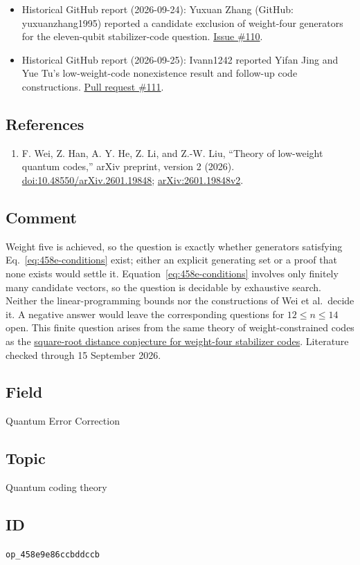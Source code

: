 \begin{itemize}
  \item Historical GitHub report (2026-09-24): Yuxuan Zhang (GitHub: yuxuanzhang1995) reported a candidate exclusion of weight-four generators for the eleven-qubit stabilizer-code question. \href{https://github.com/Naixu-Guo/quantum-open-problems/issues/110}{Issue \#110}.

  \item Historical GitHub report (2026-09-25): Ivann1242 reported Yifan Jing and Yue Tu's low-weight-code nonexistence result and follow-up code constructions. \href{https://github.com/Naixu-Guo/quantum-open-problems/pull/111}{Pull request \#111}.
\end{itemize}

\subsection*{References}

\begin{enumerate}[label={},leftmargin=4.8em,labelsep=0.5em]
  \footnotesize
  \item[\textup{[WHH+26]}]\label{ref:458e-wei}
  F. Wei, Z. Han, A. Y. He, Z. Li, and Z.-W. Liu, ``Theory of low-weight quantum codes,'' arXiv preprint, version 2 (2026). \href{https://doi.org/10.48550/arXiv.2601.19848}{doi:10.48550/arXiv.2601.19848}; \href{https://arxiv.org/abs/2601.19848v2}{arXiv:2601.19848v2}.
\end{enumerate}

\subsection*{Comment}

Weight five is achieved, so the question is exactly whether generators satisfying Eq.~\eqref{eq:458e-conditions} exist; either an explicit generating set or a proof that none exists would settle it. Equation~\eqref{eq:458e-conditions} involves only finitely many candidate vectors, so the question is decidable by exhaustive search. Neither the linear-programming bounds nor the constructions of Wei et al.\ decide it. A negative answer would leave the corresponding questions for $12\leq n\leq14$ open. This finite question arises from the same theory of weight-constrained codes as the \href{https://qiqc-op.com/problem/op_ad474bf3083462b6/}{square-root distance conjecture for weight-four stabilizer codes}. Literature checked through 15 September 2026.

\subsection*{Field}

Quantum Error Correction

\subsection*{Topic}

Quantum coding theory

\subsection*{ID}

\texttt{op\_458e9e86ccbddccb}
